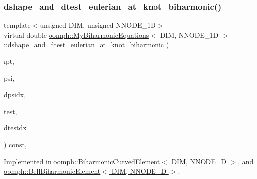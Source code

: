 \subsubsection{\texorpdfstring{dshape\+\_\+and\+\_\+dtest\+\_\+eulerian\+\_\+at\+\_\+knot\+\_\+biharmonic()}{dshape\_and\_dtest\_eulerian\_at\_knot\_biharmonic()}\hspace{0.1cm}{\footnotesize\ttfamily [1/2]}}
{\footnotesize\ttfamily template$<$unsigned D\+IM, unsigned N\+N\+O\+D\+E\+\_\+1D$>$ \\
virtual double \hyperlink{classoomph_1_1MyBiharmonicEquations}{oomph\+::\+My\+Biharmonic\+Equations}$<$ D\+IM, N\+N\+O\+D\+E\+\_\+1D $>$\+::dshape\+\_\+and\+\_\+dtest\+\_\+eulerian\+\_\+at\+\_\+knot\+\_\+biharmonic (\begin{DoxyParamCaption}\item[{const unsigned \&}]{ipt,  }\item[{Shape \&}]{psi,  }\item[{D\+Shape \&}]{dpsidx,  }\item[{Shape \&}]{test,  }\item[{D\+Shape \&}]{dtestdx }\end{DoxyParamCaption}) const\hspace{0.3cm}{\ttfamily [protected]}, {}}



Implemented in \hyperlink{classoomph_1_1BiharmonicCurvedElement_a41fe37c99757e9da1181e4e769752915}{oomph\+::\+Biharmonic\+Curved\+Element$<$ D\+I\+M, N\+N\+O\+D\+E\+\_\+D $>$}, and \hyperlink{classoomph_1_1BellBiharmonicElement_ac2875860aa48405076c296341fd778df}{oomph\+::\+Bell\+Biharmonic\+Element$<$ D\+I\+M, N\+N\+O\+D\+E\+\_\+D $>$}.

\mbox{\label{classoomph_1_1MyBiharmonicEquations_a08e45fddb2c25119e6ba826cd6cafdbf}} 
